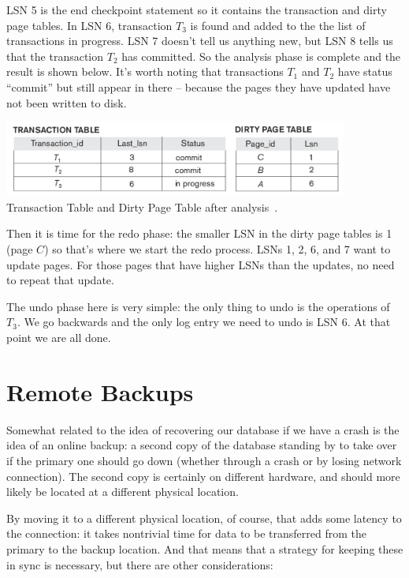 LSN 5 is the end checkpoint statement so it contains the transaction and dirty page tables. In LSN 6, transaction $T_{3}$ is found and added to the the list of transactions in progress. LSN 7 doesn't tell us anything new, but LSN 8 tells us that the transaction $T_{2}$ has committed. So the analysis phase is complete and the result is shown below. It's worth noting that transactions $T_{1}$ and $T_{2}$ have status ``commit'' but still appear in there -- because the pages they have updated have not been written to disk. 

\begin{center}
\includegraphics[width=0.85\textwidth]{images/aries-3}\\
Transaction Table and Dirty Page Table after analysis~\cite{fds}.
\end{center}

Then it is time for the redo phase: the smaller LSN in the dirty page tables is 1 (page $C$) so that's where we start the redo process. LSNs 1, 2, 6, and 7 want to update pages. For those pages that have higher LSNs than the updates, no need to repeat that update.

The undo phase here is very simple: the only thing to undo is the operations of $T_{3}$. We go backwards and the only log entry we need to undo is LSN 6. At that point we are all done.


\section*{Remote Backups}

Somewhat related to the idea of recovering our database if we have a crash is the idea of an online backup: a second copy of the database standing by to take over if the primary one should go down (whether through a crash or by losing network connection). The second copy is certainly on different hardware, and should more likely be located at a different physical location. 

By moving it to a different physical location, of course, that adds some latency to the connection: it takes nontrivial time for data to be transferred from the primary to the backup location. And that means that a strategy for keeping these in sync is necessary, but there are other considerations:


